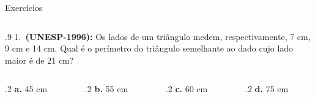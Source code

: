 \documentclass[aspectratio=169, t, 8pt]{beamer}
\begin{document}
    \begin{frame} {Exercícios} %
        \begin{columns}
            \centering
            \begin{column}{.9\textwidth} %
                1.~\textbf{(UNESP-1996): } Os lados de um triângulo medem, respectivamente, 7 cm, 9 cm e 14 cm. Qual é o perímetro do triângulo semelhante ao dado cujo lado maior é de 21 cm?

                \vspace{1.2em}
                \centering
                \begin{columns}
                    \begin{column}{.2\textwidth}
                        \textbf{a.} 45 cm
                    \end{column}
                    \begin{column}{.2\textwidth}
                        \textbf{b.} 55 cm
                    \end{column}
                    \begin{column}{.2\textwidth}
                        \textbf{c.} 60 cm
                    \end{column}
                    \begin{column}{.2\textwidth}
                        \textbf{d.} 75 cm
                    \end{column}
                \end{columns}
            \end{column}
        \end{columns}
    \end{frame}
\end{document}
